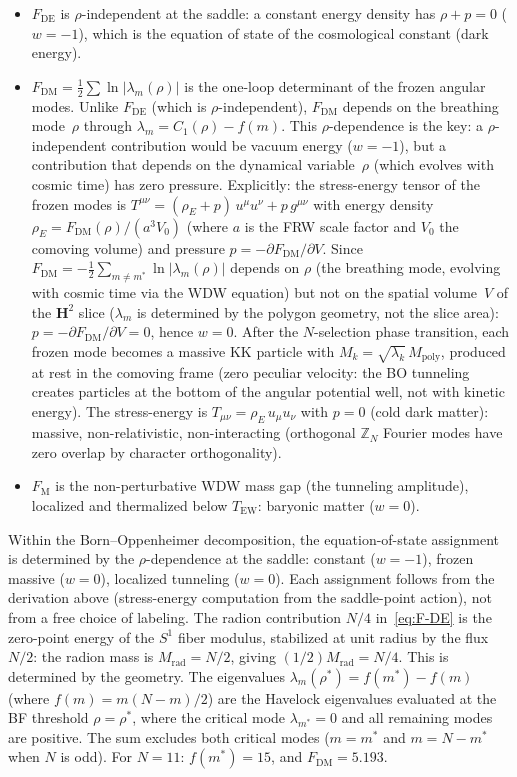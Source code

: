 \begin{itemize}
\item $F_{\mathrm{DE}}$ is $\rho$-independent at the saddle:
  a constant energy density has $\rho + p = 0$ ($w = -1$),
  which is the equation of state of the cosmological constant
  (dark energy).
\item $F_{\mathrm{DM}} = \tfrac{1}{2}\sum\ln|\lambda_m(\rho)|$
  is the one-loop determinant of the frozen angular modes.
  Unlike $F_{\mathrm{DE}}$ (which is $\rho$-independent),
  $F_{\mathrm{DM}}$ depends on the breathing mode~$\rho$
  through $\lambda_m = C_1(\rho) - f(m)$.
  This $\rho$-dependence is the key:
  a $\rho$-independent contribution would be vacuum energy
  ($w = -1$), but a contribution that depends on the
  dynamical variable~$\rho$ (which evolves with cosmic time)
  has zero pressure.
  Explicitly: the stress-energy tensor of the frozen modes is
  $T^{\mu\nu} = (\rho_E + p)\,u^\mu u^\nu + p\,g^{\mu\nu}$
  with energy density $\rho_E = F_{\mathrm{DM}}(\rho)/(a^3 V_0)$
  (where $a$ is the FRW scale factor and
  $V_0$ the comoving volume) and pressure
  $p = -\partial F_{\mathrm{DM}}/\partial V$.
  Since $F_{\mathrm{DM}} = -\tfrac{1}{2}\sum_{m \ne m^*}
  \ln|\lambda_m(\rho)|$ depends on $\rho$ (the breathing mode,
  evolving with cosmic time via the WDW equation)
  but not on the spatial volume~$V$ of the $\mathbf{H}^2$ slice
  ($\lambda_m$ is determined by the polygon geometry,
  not the slice area):
  $p = -\partial F_{\mathrm{DM}}/\partial V = 0$, hence $w = 0$.
  After the $N$-selection phase transition, each frozen mode
  becomes a massive KK particle with
  $M_k = \sqrt{\lambda_k}\,M_{\mathrm{poly}}$,
  produced at rest in the comoving frame
  (zero peculiar velocity: the BO tunneling creates
  particles at the bottom of the angular potential well,
  not with kinetic energy).
  The stress-energy is
  $T_{\mu\nu} = \rho_E\,u_\mu u_\nu$ with $p = 0$
  (cold dark matter): massive, non-relativistic,
  non-interacting (orthogonal $\mathbb{Z}_N$ Fourier modes
  have zero overlap by character orthogonality).
\item $F_{\mathrm{M}}$ is the non-perturbative
  WDW mass gap (the tunneling amplitude), localized and
  thermalized below $T_{\mathrm{EW}}$: baryonic matter ($w = 0$).
\end{itemize}
Within the Born--Oppenheimer decomposition, the
equation-of-state assignment is determined by the
$\rho$-dependence at the saddle: constant ($w = {-}1$),
frozen massive ($w = 0$), localized tunneling ($w = 0$).
Each assignment follows from the derivation above
(stress-energy computation from the saddle-point action),
not from a free choice of labeling.
The radion contribution $N/4$ in~\eqref{eq:F-DE} is the zero-point
energy of the $S^1$ fiber modulus, stabilized at unit radius by
the flux~$N/2$: the radion mass is $M_{\mathrm{rad}} = N/2$,
giving $(1/2)M_{\mathrm{rad}} = N/4$.
This is determined by the geometry.
The eigenvalues $\lambda_m(\rho^*) = f(m^*) - f(m)$
(where $f(m) = m(N{-}m)/2$) are the Havelock eigenvalues evaluated at
the BF threshold $\rho = \rho^*$, where the critical mode
$\lambda_{m^*} = 0$ and all remaining modes are positive.
The sum excludes both critical modes
($m = m^*$ and $m = N - m^*$ when $N$ is odd).
For $N = 11$: $f(m^*) = 15$, and $F_{\mathrm{DM}} = 5.193$.

